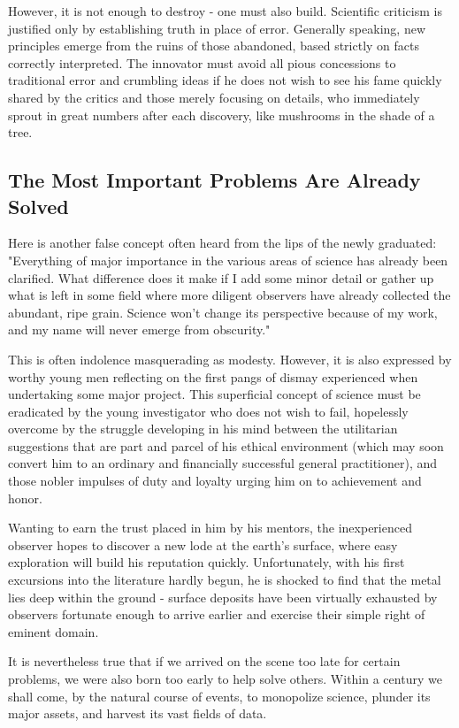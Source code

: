 \documentclass{article}
\begin{document}
However, it is not enough to destroy - one must also build. Scientific criticism is justified only by establishing truth in place of error. Generally speaking, new principles emerge from the ruins of those abandoned, based strictly on facts correctly interpreted. The innovator must avoid all pious concessions to traditional error and crumbling ideas if he does not wish to see his fame quickly shared by the critics and those merely focusing on details, who immediately sprout in great numbers after each discovery, like mushrooms in the shade of a tree.

\subsection*{The Most Important Problems Are Already Solved}

Here is another false concept often heard from the lips of the newly graduated: "Everything of major importance in the various areas of science has already been clarified. What difference does it make if I add some minor detail or gather up what is left in some field where more diligent observers have already collected the abundant, ripe grain. Science won’t change its perspective because of my work, and my name will never emerge from obscurity."

This is often indolence masquerading as modesty. However, it is also expressed by worthy young men reflecting on the first pangs of dismay experienced when undertaking some major project. This superficial concept of science must be eradicated by the young investigator who does not wish to fail, hopelessly overcome by the struggle developing in his mind between the utilitarian suggestions that are part and parcel of his ethical environment (which may soon convert him to an ordinary and financially successful general practitioner), and those nobler impulses of duty and loyalty urging him on to achievement and honor.

Wanting to earn the trust placed in him by his mentors, the inexperienced observer hopes to discover a new lode at the earth’s surface, where easy exploration will build his reputation quickly. Unfortunately, with his first excursions into the literature hardly begun, he is shocked to find that the metal lies deep within the ground - surface deposits have been virtually exhausted by observers fortunate enough to arrive earlier and exercise their simple right of eminent domain.

It is nevertheless true that if we arrived on the scene too late for certain problems, we were also born too early to help solve others. Within a century we shall come, by the natural course of events, to monopolize science, plunder its major assets, and harvest its vast fields of data.
\end{document}

